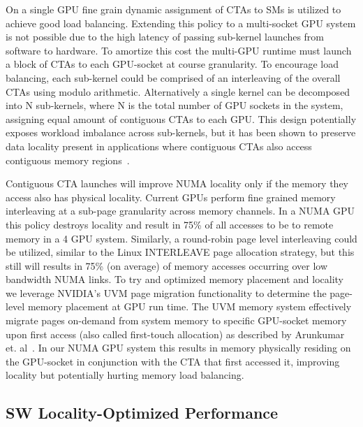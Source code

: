 On a single GPU fine grain dynamic assignment of CTAs to SMs is utilized to 
achieve good load balancing.  Extending this policy to a multi-socket GPU 
system is not possible due to the high latency of passing sub-kernel 
launches from software to hardware.  To amortize this cost the multi-GPU runtime 
must launch a block of CTAs to each GPU-socket at course granularity.  To 
encourage load balancing, each sub-kernel could be comprised of an interleaving 
of the overall CTAs using modulo arithmetic.  Alternatively a single kernel can be 
decomposed into N sub-kernels, where N is the total number of GPU sockets in 
the system, assigning equal amount of contiguous CTAs to each GPU.  This design 
potentially exposes workload imbalance across sub-kernels, but it has 
been shown to preserve data locality present in applications where contiguous 
CTAs also access contiguous memory regions~\cite{Cabezas2015,Arunkumar2017}.

Contiguous CTA launches will improve NUMA locality only if the memory they access
also has physical locality. Current GPUs perform fine grained memory interleaving 
at a sub-page granularity 
across memory channels.  In a NUMA GPU this policy destroys locality and 
result in 75\% of all accesses to be to remote memory in a 4 GPU system. Similarly, a round-robin page level 
interleaving could be utilized, similar to the Linux INTERLEAVE page allocation 
strategy, but this still will results in 
75\% (on average) of memory accesses occurring over low bandwidth NUMA links. To
try and optimized memory placement and locality we leverage NVIDIA's 
UVM page migration functionality to determine the page-level memory placement
at GPU run time. The UVM memory system effectively migrate pages on-demand from system 
memory to specific GPU-socket memory upon first access (also called first-touch 
allocation) as described by Arunkumar et. al~\cite{Arunkumar2017}. In
our NUMA GPU system this results in memory physically residing on the GPU-socket
in conjunction with the CTA that first accessed it, improving locality but
potentially hurting memory load balancing.

\vspace{-.05in}
\subsection{SW Locality-Optimized Performance}

